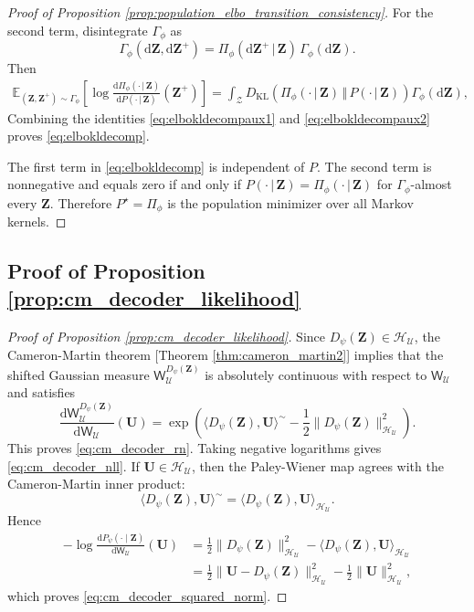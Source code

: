 \documentclass[11pt]{article}
\renewcommand{\d}{\mathrm{d}}
\begin{document}
\begin{proof}[Proof of Proposition \ref{prop:population_elbo_transition_consistency}]
For the second term, disintegrate $\Gamma_\phi$ as
\[
\Gamma_\phi(\d\mathbf Z,\d\mathbf Z^+)=\Pi_\phi(\d\mathbf Z^+\,|\,\mathbf Z)\,\Gamma_\phi(\d\mathbf Z).
\]
Then
\begin{equation}
\begin{aligned}
\mathbb E_{(\mathbf Z,\mathbf Z^+)\sim\Gamma_\phi}
\left[
\log\frac{\d\Pi_\phi(\cdot\,|\,\mathbf{Z})}{\d P(\cdot\,|\,\mathbf Z)}(\mathbf Z^+)
\right]=\int_{\mathcal Z}
D_{\mathrm{KL}}
\left(\Pi_\phi(\cdot\,|\,\mathbf Z)\,\Vert\,P(\cdot\,|\,\mathbf Z)\right)
\Gamma_\phi(\d\mathbf Z),
\end{aligned}\label{eq:elbokldecompaux2}
\end{equation}
Combining the identities \eqref{eq:elbokldecompaux1} and \eqref{eq:elbokldecompaux2} proves \eqref{eq:elbokldecomp}.

The first term in \eqref{eq:elbokldecomp} is independent of $P$. The second term is nonnegative and equals zero if and only if $P(\cdot\,|\,\mathbf Z)=\Pi_\phi(\cdot\,|\,\mathbf Z)$ for
$\Gamma_\phi$-almost every $\mathbf Z$. Therefore $P^\star=\Pi_\phi$ is the population minimizer over all Markov kernels.
\end{proof}

\subsection{Proof of Proposition \ref{prop:cm_decoder_likelihood}}
\begin{proof}[Proof of Proposition \ref{prop:cm_decoder_likelihood}]
Since $D_\psi(\mathbf Z)\in \mathcal H_{\mathcal U}$, the
Cameron-Martin theorem [Theorem \ref{thm:cameron_martin2}] implies that the shifted Gaussian measure $\mathsf W_{\mathcal U}^{D_\psi(\mathbf Z)}$ is absolutely continuous with respect to $\mathsf W_{\mathcal U}$ and satisfies
\[
    \frac{\d\mathsf W_{\mathcal U}^{D_\psi(\mathbf Z)}}{\d\mathsf W_{\mathcal U}}(\mathbf U)=\exp\left(\langle D_\psi(\mathbf Z),\mathbf U\rangle^\sim
    -\frac12 \|D_\psi(\mathbf Z)\|_{\mathcal H_{\mathcal U}}^2
    \right).
\]
This proves \eqref{eq:cm_decoder_rn}. Taking negative logarithms gives \eqref{eq:cm_decoder_nll}. If $\mathbf U\in\mathcal H_{\mathcal U}$, then the Paley-Wiener map agrees with the Cameron-Martin inner product:
\[
    \langle D_\psi(\mathbf Z),\mathbf U\rangle^\sim
    =
    \langle D_\psi(\mathbf Z),\mathbf U\rangle_{\mathcal H_{\mathcal U}}.
\]
Hence
\[
\begin{aligned}
-\log\frac{\d P_\psi(\cdot\mid \mathbf Z)}{\d\mathsf W_{\mathcal U}}(\mathbf U)
&=\frac12
\|D_\psi(\mathbf Z)\|_{\mathcal H_{\mathcal U}}^2-
\langle D_\psi(\mathbf Z),\mathbf U\rangle_{\mathcal H_{\mathcal U}}\\
&=\frac12\|\mathbf U-D_\psi(\mathbf Z)\|_{\mathcal H_{\mathcal U}}^2-\frac12\|\mathbf U\|_{\mathcal H_{\mathcal U}}^2,
\end{aligned}
\]
which proves \eqref{eq:cm_decoder_squared_norm}.
\end{proof}
\end{document}
